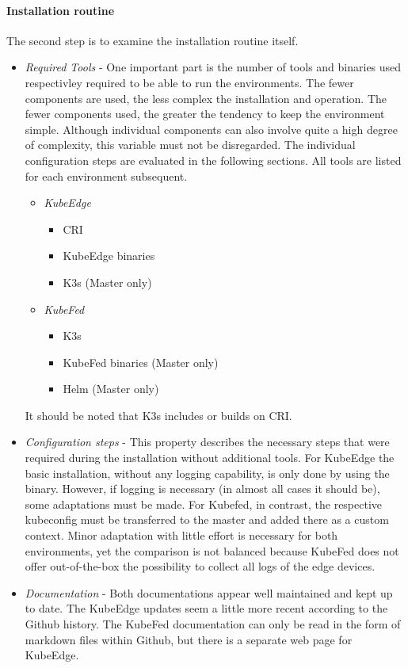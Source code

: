 \documentclass[MSC,Master,english]{twbook}%
\begin{document}
\paragraph{Installation routine} The second step is to examine the installation routine itself.
\begin{itemize}
    \item \textit{Required Tools} - One important part is the number of tools and binaries used respectivley required to be able to run the environments. The fewer components are used, the less complex the installation and operation. The fewer components used, the greater the tendency to keep the environment simple. Although individual components can also involve quite a high degree of complexity, this variable must not be disregarded. The individual configuration steps are evaluated in the following sections. All tools are listed for each environment subsequent.
    \begin{itemize} 
        \item \textit{KubeEdge}
        \begin{itemize}
            \item \ac{CRI}
            \item KubeEdge binaries
            \item K3s (Master only)
        \end{itemize}
        \item \textit{KubeFed}
        \begin{itemize}
            \item K3s
            \item KubeFed binaries (Master only)
            \item Helm (Master only)
        \end{itemize}
    \end{itemize}
    It should be noted that K3s includes or builds on \ac{CRI}. 
    \item \textit{Configuration steps} - This property describes the necessary steps that were required during the installation without additional tools. For KubeEdge the basic installation, without any logging capability, is only done by using the binary. However, if logging is necessary (in almost all cases it should be), some adaptations must be made. For Kubefed, in contrast, the respective kubeconfig must be transferred to the master and added there as a custom context. Minor adaptation with little effort is necessary for both environments, yet the comparison is not balanced because KubeFed does not offer out-of-the-box the possibility to collect all logs of the edge devices.
    \item \textit{Documentation}  - Both documentations appear well maintained and kept up to date. The KubeEdge updates seem a little more recent according to the Github history. The KubeFed documentation can only be read in the form of markdown files within Github, but there is a separate web page for KubeEdge.
\end{itemize}
\end{document}
